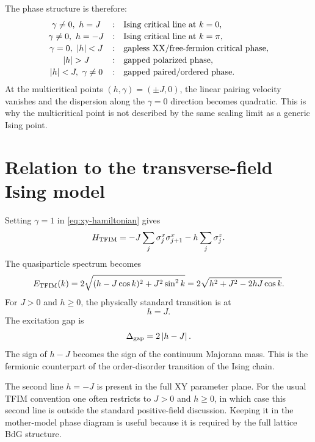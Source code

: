 The phase structure is therefore:
\begin{equation}
\label{eq:xy-mother-phase-summary}
\begin{array}{ccl}
\gamma\neq0,\ h=J &:& \text{Ising critical line at } k=0,\\[2pt]
\gamma\neq0,\ h=-J &:& \text{Ising critical line at } k=\pi,\\[2pt]
\gamma=0,\ \abs{h}<J &:& \text{gapless XX/free-fermion critical phase},\\[2pt]
\abs{h}>J &:& \text{gapped polarized phase},\\[2pt]
\abs{h}<J,\ \gamma\neq0 &:& \text{gapped paired/ordered phase}.
\end{array}
\end{equation}
At the multicritical points $(h,\gamma)=(\pm J,0)$, the linear pairing velocity
vanishes and the dispersion along the $\gamma=0$ direction becomes quadratic.
This is why the multicritical point is not described by the same scaling limit as
a generic Ising point.

\section{Relation to the transverse-field Ising model}
\label{sec:xy-relation-to-tfim}

Setting $\gamma=1$ in \cref{eq:xy-hamiltonian} gives
\begin{equation}
\label{eq:xy-mother-tfim-limit}
    H_{\rm TFIM}
    =
    -J\sum_j\sigma_j^x\sigma_{j+1}^x
    -h\sum_j\sigma_j^z.
\end{equation}
The quasiparticle spectrum becomes
\begin{equation}
\label{eq:xy-mother-tfim-spectrum}
    E_{\rm TFIM}(k)
    =
    2\sqrt{(h-J\cos k)^2+J^2\sin^2 k}
    =
    2\sqrt{h^2+J^2-2hJ\cos k}.
\end{equation}
For $J>0$ and $h\ge0$, the physically standard transition is at
\begin{equation}
\label{eq:xy-mother-tfim-critical-h-positive}
    h=J.
\end{equation}
The excitation gap is
\begin{equation}
\label{eq:xy-mother-tfim-gap}
    \Delta_{\rm gap}=2\left|h-J\right|.
\end{equation}
The sign of $h-J$ becomes the sign of the continuum Majorana mass.  This is the
fermionic counterpart of the order-disorder transition of the Ising chain.

The second line $h=-J$ is present in the full XY parameter plane.  For the usual
TFIM convention one often restricts to $J>0$ and $h\ge0$, in which case this
second line is outside the standard positive-field discussion.  Keeping it in the
mother-model phase diagram is useful because it is required by the full lattice
BdG structure.

